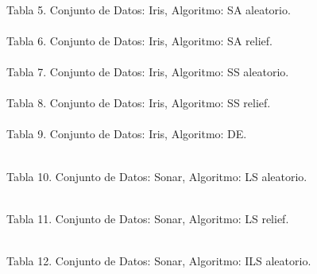 \documentclass{ci5652}
\begin{document}
\begin{adjustbox}{width=\columnwidth, center=\columnwidth}
%
\\
\end{adjustbox}
Tabla 5. Conjunto de Datos: Iris, Algoritmo: SA aleatorio.\\

\begin{adjustbox}{width=\columnwidth, center=\columnwidth}
%
\\
\end{adjustbox}
Tabla 6. Conjunto de Datos: Iris, Algoritmo: SA relief.\\

\begin{adjustbox}{width=\columnwidth, center=\columnwidth}
%
\\
\end{adjustbox}
Tabla 7. Conjunto de Datos: Iris, Algoritmo: SS aleatorio.\\

%
\\
Tabla 8. Conjunto de Datos: Iris, Algoritmo: SS relief.\\

%
\\
Tabla 9. Conjunto de Datos: Iris, Algoritmo: DE.
\newpage

%
\\
Tabla 10. Conjunto de Datos: Sonar, Algoritmo: LS aleatorio.

%
\\
Tabla 11. Conjunto de Datos: Sonar, Algoritmo: LS relief.

\begin{adjustbox}{width=\columnwidth, center=\columnwidth}
%
\\
\end{adjustbox}
Tabla 12. Conjunto de Datos: Sonar, Algoritmo: ILS aleatorio.
\end{document}

